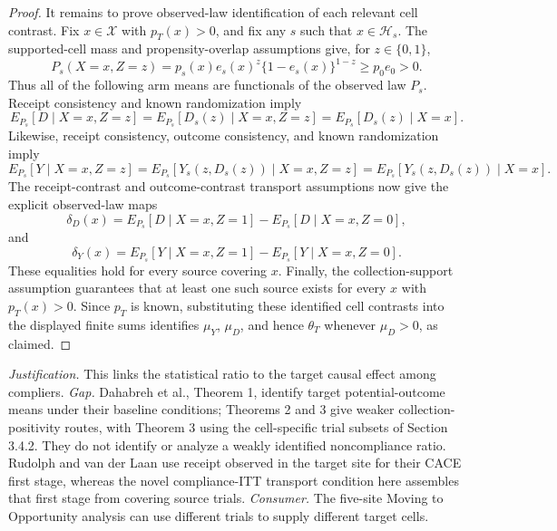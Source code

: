 \documentclass{article}
\begin{document}
\begin{proof}
It remains to prove observed-law identification of each relevant cell contrast.  Fix \(x\in\mathcal X\) with \(p_T(x)>0\), and fix any \(s\) such that \(x\in\mathcal H_s\).  The supported-cell mass and propensity-overlap assumptions give, for \(z\in\{0,1\}\),
\[
P_s(X=x,Z=z)
=p_s(x)e_s(x)^z\{1-e_s(x)\}^{1-z}
\ge p_0e_0>0.
\]
Thus all of the following arm means are functionals of the observed law \(P_s\).  Receipt consistency and known randomization imply
\[
E_{P_s}[D\mid X=x,Z=z]
=E_{P_s}[D_s(z)\mid X=x,Z=z]
=E_{P_s}[D_s(z)\mid X=x].
\]
Likewise, receipt consistency, outcome consistency, and known randomization imply
\[
E_{P_s}[Y\mid X=x,Z=z]
=E_{P_s}[Y_s(z,D_s(z))\mid X=x,Z=z]
=E_{P_s}[Y_s(z,D_s(z))\mid X=x].
\]
The receipt-contrast and outcome-contrast transport assumptions now give the explicit observed-law maps
\[
\delta_D(x)
=E_{P_s}[D\mid X=x,Z=1]-E_{P_s}[D\mid X=x,Z=0],
\]
and
\[
\delta_Y(x)
=E_{P_s}[Y\mid X=x,Z=1]-E_{P_s}[Y\mid X=x,Z=0].
\]
These equalities hold for every source covering \(x\).  Finally, the collection-support assumption guarantees that at least one such source exists for every \(x\) with \(p_T(x)>0\).  Since \(p_T\) is known, substituting these identified cell contrasts into the displayed finite sums identifies \(\mu_Y\), \(\mu_D\), and hence \(\theta_T\) whenever \(\mu_D>0\), as claimed.
\end{proof}
\par\smallskip\noindent \textit{Justification.} This links the statistical ratio to the target causal effect among compliers. \textit{Gap.} Dahabreh et al., Theorem 1, identify target potential-outcome means under their baseline conditions; Theorems 2 and 3 give weaker collection-positivity routes, with Theorem 3 using the cell-specific trial subsets of Section 3.4.2. They do not identify or analyze a weakly identified noncompliance ratio. Rudolph and van der Laan use receipt observed in the target site for their CACE first stage, whereas the novel compliance-ITT transport condition here assembles that first stage from covering source trials. \textit{Consumer.} The five-site Moving to Opportunity analysis can use different trials to supply different target cells.
\end{document}

